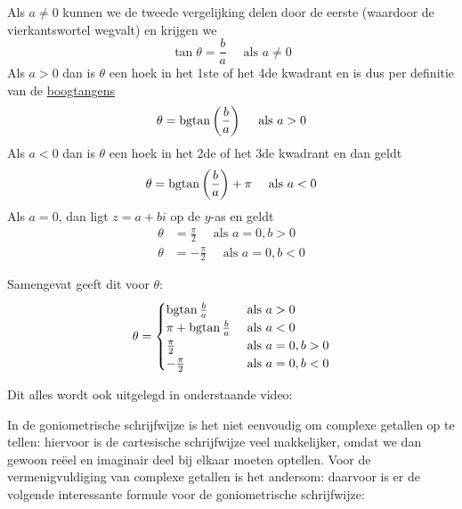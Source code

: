 \documentclass{ximera}
\begin{document}
 
\begin{remark}\nl
     
    Als $a \neq 0$ kunnen we de tweede vergelijking delen door de eerste (waardoor de vierkantswortel wegvalt) en krijgen we
    $$
    \tan \theta = \frac{b}{a}  \quad \text{ als } a \neq 0
    $$
    Als $a>0$ dan is $\theta$ een hoek in het 1ste of het 4de kwadrant en is dus per definitie van de \hyperref[xim:cyclometrische_functies]{boogtangens }
    $$
    \theta  =  \operatorname{bgtan} \left(\frac{b}{a}\right) \quad \text{ als }  a>0
    $$
    Als $a<0$ dan is $\theta$ een hoek in het 2de of het 3de kwadrant en dan geldt
    $$
    \theta  =  \operatorname{bgtan} \left(\frac{b}{a}\right) + \pi \quad \text{ als }  a<0
    $$
    Als $a=0$, dan ligt $z=a+bi$ op de $y$-as en geldt
    \begin{align*}
    \theta & =  \frac{\pi}{2}  \quad\text{ als } a=0, b > 0\\
    \theta & = -\frac{\pi}{2} \quad\text{ als } a=0, b < 0
    \end{align*}
     
    Samengevat geeft dit voor $\theta$:
    $$
    \theta = \begin{cases}
    \bgtan \frac{b}{a}       & \text{ als } a>0        \\
    \pi + \bgtan \frac{b}{a} & \text{ als } a<0        \\   %
    \frac{\pi}{2}            & \text{ als } a=0, b > 0 \\
    -\frac{\pi}{2}           & \text{ als } a=0, b < 0
    \end{cases}
    $$
    \begin{basicSkip}
Dit alles wordt ook uitgelegd in onderstaande video:
 
\end{basicSkip}
 
\end{remark}
 
 
 
\nl
 
In de goniometrische schrijfwijze is het niet eenvoudig om complexe getallen op te tellen: hiervoor is de cartesische schrijfwijze veel makkelijker, omdat we dan gewoon reëel en imaginair deel bij elkaar moeten optellen. Voor de vermenigvuldiging van complexe getallen is het andersom: daarvoor is er de volgende interessante formule voor de goniometrische schrijfwijze:
 
\end{document}
